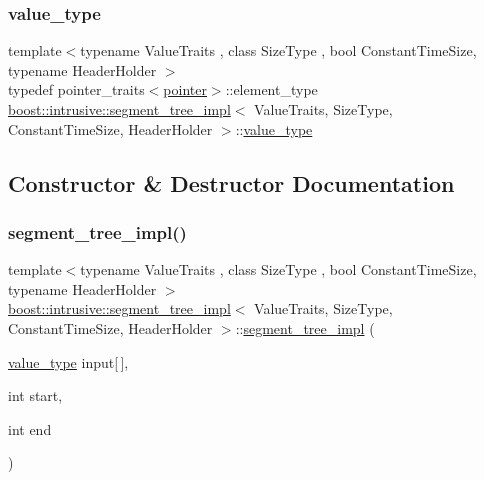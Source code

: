 \subsubsection{\texorpdfstring{value\+\_\+type}{value\_type}}
{\footnotesize\ttfamily template$<$typename Value\+Traits , class Size\+Type , bool Constant\+Time\+Size, typename Header\+Holder $>$ \\
typedef pointer\+\_\+traits$<$\hyperlink{classboost_1_1intrusive_1_1segment__tree__impl_a4345924066a33f309182d027249887ab}{pointer}$>$\+::element\+\_\+type \hyperlink{classboost_1_1intrusive_1_1segment__tree__impl}{boost\+::intrusive\+::segment\+\_\+tree\+\_\+impl}$<$ Value\+Traits, Size\+Type, Constant\+Time\+Size, Header\+Holder $>$\+::\hyperlink{classboost_1_1intrusive_1_1segment__tree__impl_ab1fd253eacbcdbacb8e5e73fc580626d}{value\+\_\+type}}



\subsection{Constructor \& Destructor Documentation}
\mbox{\label{classboost_1_1intrusive_1_1segment__tree__impl_abda73e6d62b92e32db5df65cb425ac59}} 
\subsubsection{\texorpdfstring{segment\+\_\+tree\+\_\+impl()}{segment\_tree\_impl()}}
{\footnotesize\ttfamily template$<$typename Value\+Traits , class Size\+Type , bool Constant\+Time\+Size, typename Header\+Holder $>$ \\
\hyperlink{classboost_1_1intrusive_1_1segment__tree__impl}{boost\+::intrusive\+::segment\+\_\+tree\+\_\+impl}$<$ Value\+Traits, Size\+Type, Constant\+Time\+Size, Header\+Holder $>$\+::\hyperlink{classboost_1_1intrusive_1_1segment__tree__impl}{segment\+\_\+tree\+\_\+impl} (\begin{DoxyParamCaption}\item[{\hyperlink{classboost_1_1intrusive_1_1segment__tree__impl_ab1fd253eacbcdbacb8e5e73fc580626d}{value\+\_\+type}}]{input\mbox{[}$\,$\mbox{]},  }\item[{int}]{start,  }\item[{int}]{end }\end{DoxyParamCaption})\hspace{0.3cm}{\ttfamily [inline]}}



